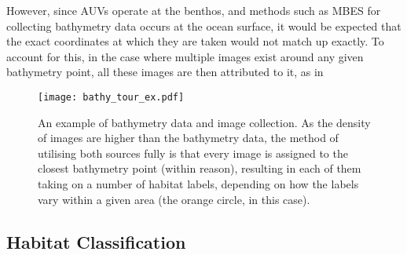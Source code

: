 However, since AUVs operate at the benthos, and methods such as MBES for collecting bathymetry data occurs at the ocean surface, it would be expected that the exact coordinates at which they are taken would not match up exactly. To account for this, in the case where multiple images exist around any given bathymetry point, all these images are then attributed to it, as in 

\begin{figure}
    \texttt{[image: bathy\_tour\_ex.pdf]}
    \caption{An example of bathymetry data and image collection. As the density of images are higher than the bathymetry data, the method of utilising both sources fully is that every image is assigned to the closest bathymetry point (within reason), resulting in each of them taking on a number of habitat labels, depending on how the labels vary within a given area (the orange circle, in this case).}
    \label{fig:bathy_tour_ex}
\end{figure}

% 

\subsection{Habitat Classification}

